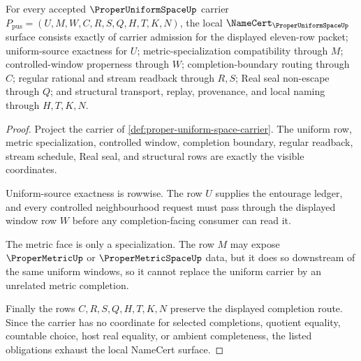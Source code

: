 \begin{theorem}
\label{thm:proper-uniform-space-namecert-obligations}
For every accepted $\ProperUniformSpaceUp$ carrier $P_{\mathrm{pus}}=(U,M,W,C,R,S,Q,H,T,K,N)$, the local $\NameCert_{\ProperUniformSpaceUp}$ surface consists exactly of carrier admission for the displayed eleven-row packet; uniform-source exactness for $U$; metric-specialization compatibility through $M$; controlled-window properness through $W$; completion-boundary routing through $C$; regular rational and stream readback through $R,S$; Real seal non-escape through $Q$; and structural transport, replay, provenance, and local naming through $H,T,K,N$.
\end{theorem}
\begin{proof}
Project the carrier of \autoref{def:proper-uniform-space-carrier}. The uniform row, metric specialization, controlled window, completion boundary, regular readback, stream schedule, Real seal, and structural rows are exactly the visible coordinates.

Uniform-source exactness is rowwise. The row $U$ supplies the entourage ledger, and every controlled neighbourhood request must pass through the displayed window row $W$ before any completion-facing consumer can read it.

The metric face is only a specialization. The row $M$ may expose $\ProperMetricUp$ or $\ProperMetricSpaceUp$ data, but it does so downstream of the same uniform windows, so it cannot replace the uniform carrier by an unrelated metric completion.

Finally the rows $C,R,S,Q,H,T,K,N$ preserve the displayed completion route. Since the carrier has no coordinate for selected completions, quotient equality, countable choice, host real equality, or ambient completeness, the listed obligations exhaust the local NameCert surface.
\end{proof}

